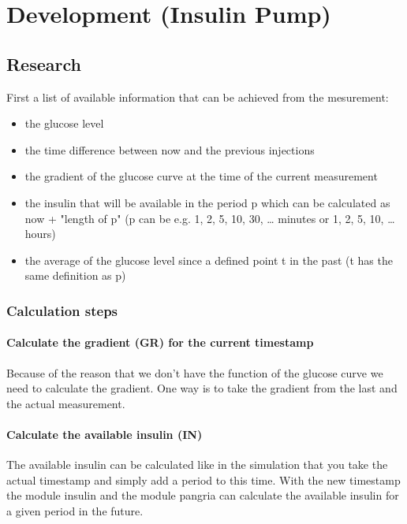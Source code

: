 \documentclass[pdflatex,a4paper,11pt,english]{scrreprt}
\begin{document}
\chapter{Development (Insulin Pump)}

\section{Research}
First a list of available information that can be achieved from the
mesurement:
\begin{itemize}
  \item the glucose level
  \item the time difference between now and the previous injections
  \item the gradient of the glucose curve at the time of the current measurement
  \item the insulin that will be available in the period p which can be
  calculated as now + "length of p" (p can be e.g. 1, 2, 5, 10, 30, \ldots
  minutes or 1, 2, 5, 10, \ldots hours)
  \item the average of the glucose level since a defined point t in the past (t
  has the same definition as p)
\end{itemize}

\subsection{Calculation steps}

\subsubsection{Calculate the gradient (GR) for the current timestamp}
Because of the reason that we don't have the function of the glucose curve we need to calculate the gradient. One way is to take the gradient from the last and the actual measurement.

\subsubsection{Calculate the available insulin (IN)}
The available insulin can be calculated like in the simulation that you take
the actual timestamp and simply add a period to this time. With the new
timestamp the module insulin and the module pangria can calculate the available
insulin for a given period in the future.
\end{document}
